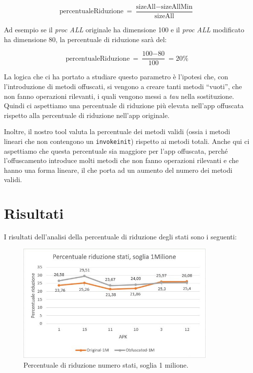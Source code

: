 \[ \text{percentualeRiduzione}\ = \frac{\text{sizeAll} - \text{sizeAllMin}}{\text{sizeAll}} \]

Ad esempio se il \textit{proc ALL} originale ha dimensione 100 e il \textit{proc ALL} modificato ha dimensione 80, la percentuale di riduzione sarà del:

\[ \text{percentualeRiduzione}\ = \frac{\text{100} - \text{80}}{\text{100}} = 20\% \]

La logica che ci ha portato a studiare questo parametro è l'ipotesi che, con l'introduzione di metodi offuscati, si vengono a creare tanti metodi ``vuoti'', che non fanno operazioni rilevanti, i quali vengono messi a \textit{tau} nella sostituzione. Quindi ci aspettiamo una percentuale di riduzione più elevata nell'app offuscata rispetto alla percentuale di riduzione nell'app originale.

Inoltre, il nostro tool valuta la percentuale dei metodi validi (ossia i metodi lineari che non contengono un \verb|invokeinit|)  rispetto ai metodi totali. Anche qui ci aspettiamo che questa percentuale sia maggiore per l'app offuscata, perché l'offuscamento introduce molti metodi che non fanno operazioni rilevanti e che hanno una forma lineare, il che porta ad un aumento del numero dei metodi validi.

\section{Risultati}

I risultati dell'analisi della percentuale di riduzione degli stati sono i seguenti:

\begin{figure}[H]
\centering
\includegraphics[width=0.88\textwidth]{img/risultati/stati_1M.jpg}
\caption{Percentuale di riduzione numero stati, soglia 1 milione.}
\label{fig:percentuale_riduzione_stati}
\end{figure}

